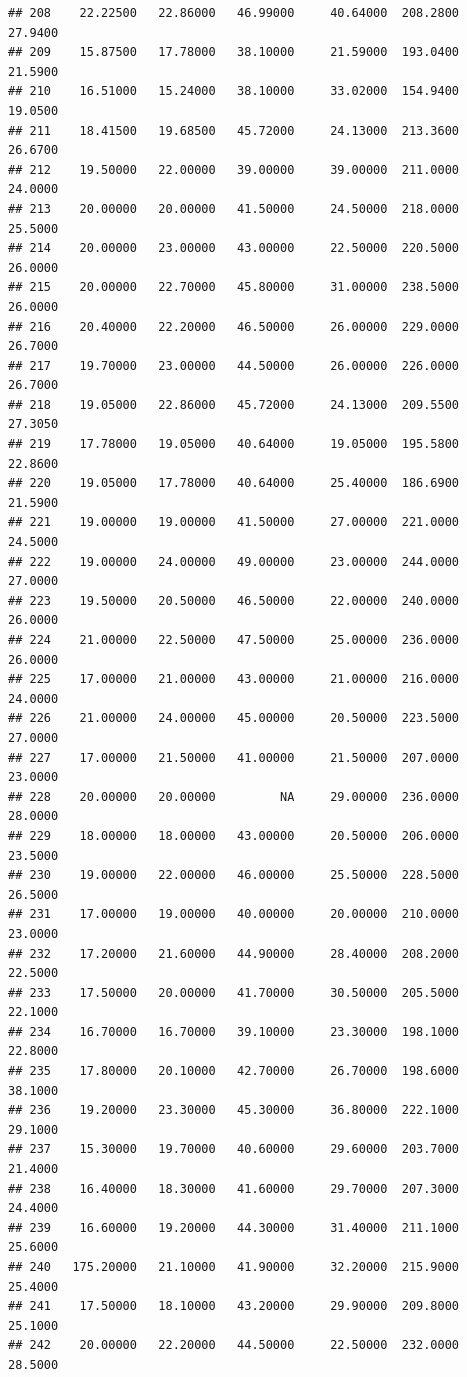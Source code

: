 \documentclass[]{article}
\begin{document}
\begin{verbatim}
## 208    22.22500   22.86000   46.99000     40.64000  208.2800     27.9400
## 209    15.87500   17.78000   38.10000     21.59000  193.0400     21.5900
## 210    16.51000   15.24000   38.10000     33.02000  154.9400     19.0500
## 211    18.41500   19.68500   45.72000     24.13000  213.3600     26.6700
## 212    19.50000   22.00000   39.00000     39.00000  211.0000     24.0000
## 213    20.00000   20.00000   41.50000     24.50000  218.0000     25.5000
## 214    20.00000   23.00000   43.00000     22.50000  220.5000     26.0000
## 215    20.00000   22.70000   45.80000     31.00000  238.5000     26.0000
## 216    20.40000   22.20000   46.50000     26.00000  229.0000     26.7000
## 217    19.70000   23.00000   44.50000     26.00000  226.0000     26.7000
## 218    19.05000   22.86000   45.72000     24.13000  209.5500     27.3050
## 219    17.78000   19.05000   40.64000     19.05000  195.5800     22.8600
## 220    19.05000   17.78000   40.64000     25.40000  186.6900     21.5900
## 221    19.00000   19.00000   41.50000     27.00000  221.0000     24.5000
## 222    19.00000   24.00000   49.00000     23.00000  244.0000     27.0000
## 223    19.50000   20.50000   46.50000     22.00000  240.0000     26.0000
## 224    21.00000   22.50000   47.50000     25.00000  236.0000     26.0000
## 225    17.00000   21.00000   43.00000     21.00000  216.0000     24.0000
## 226    21.00000   24.00000   45.00000     20.50000  223.5000     27.0000
## 227    17.00000   21.50000   41.00000     21.50000  207.0000     23.0000
## 228    20.00000   20.00000         NA     29.00000  236.0000     28.0000
## 229    18.00000   18.00000   43.00000     20.50000  206.0000     23.5000
## 230    19.00000   22.00000   46.00000     25.50000  228.5000     26.5000
## 231    17.00000   19.00000   40.00000     20.00000  210.0000     23.0000
## 232    17.20000   21.60000   44.90000     28.40000  208.2000     22.5000
## 233    17.50000   20.00000   41.70000     30.50000  205.5000     22.1000
## 234    16.70000   16.70000   39.10000     23.30000  198.1000     22.8000
## 235    17.80000   20.10000   42.70000     26.70000  198.6000     38.1000
## 236    19.20000   23.30000   45.30000     36.80000  222.1000     29.1000
## 237    15.30000   19.70000   40.60000     29.60000  203.7000     21.4000
## 238    16.40000   18.30000   41.60000     29.70000  207.3000     24.4000
## 239    16.60000   19.20000   44.30000     31.40000  211.1000     25.6000
## 240   175.20000   21.10000   41.90000     32.20000  215.9000     25.4000
## 241    17.50000   18.10000   43.20000     29.90000  209.8000     25.1000
## 242    20.00000   22.20000   44.50000     22.50000  232.0000     28.5000

\end{verbatim}
\end{document}
